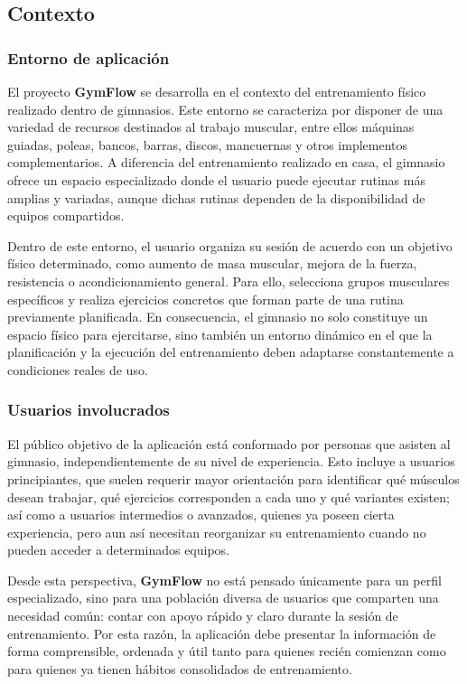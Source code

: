 \subsection{Contexto}

\subsubsection{Entorno de aplicación}

El proyecto \textbf{GymFlow} se desarrolla en el contexto del entrenamiento físico realizado dentro de gimnasios. Este entorno se caracteriza por disponer de una variedad de recursos destinados al trabajo muscular, entre ellos máquinas guiadas, poleas, bancos, barras, discos, mancuernas y otros implementos complementarios. A diferencia del entrenamiento realizado en casa, el gimnasio ofrece un espacio especializado donde el usuario puede ejecutar rutinas más amplias y variadas, aunque dichas rutinas dependen de la disponibilidad de equipos compartidos.

Dentro de este entorno, el usuario organiza su sesión de acuerdo con un objetivo físico determinado, como aumento de masa muscular, mejora de la fuerza, resistencia o acondicionamiento general. Para ello, selecciona grupos musculares específicos y realiza ejercicios concretos que forman parte de una rutina previamente planificada. En consecuencia, el gimnasio no solo constituye un espacio físico para ejercitarse, sino también un entorno dinámico en el que la planificación y la ejecución del entrenamiento deben adaptarse constantemente a condiciones reales de uso.

\subsubsection{Usuarios involucrados}

El público objetivo de la aplicación está conformado por personas que asisten al gimnasio, independientemente de su nivel de experiencia. Esto incluye a usuarios principiantes, que suelen requerir mayor orientación para identificar qué músculos desean trabajar, qué ejercicios corresponden a cada uno y qué variantes existen; así como a usuarios intermedios o avanzados, quienes ya poseen cierta experiencia, pero aun así necesitan reorganizar su entrenamiento cuando no pueden acceder a determinados equipos.

Desde esta perspectiva, \textbf{GymFlow} no está pensado únicamente para un perfil especializado, sino para una población diversa de usuarios que comparten una necesidad común: contar con apoyo rápido y claro durante la sesión de entrenamiento. Por esta razón, la aplicación debe presentar la información de forma comprensible, ordenada y útil tanto para quienes recién comienzan como para quienes ya tienen hábitos consolidados de entrenamiento.

